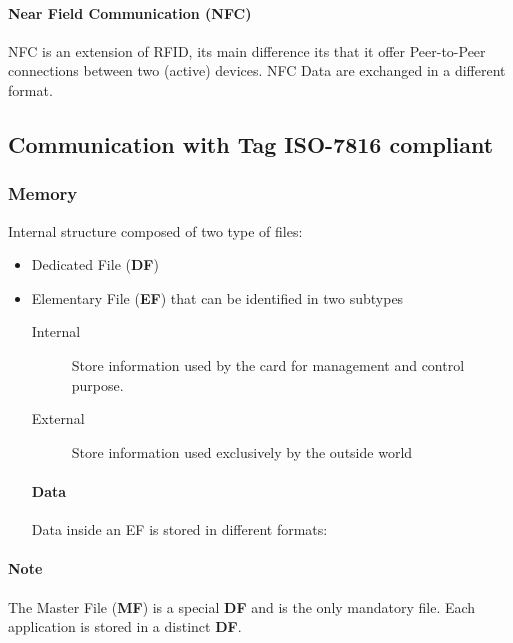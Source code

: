\paragraph{Near Field Communication (NFC)}
NFC is an extension of RFID, its main difference its that it offer
Peer-to-Peer connections between two (active) devices. NFC Data are exchanged
in a different format.


\subsection{Communication with Tag \textsc{ISO-7816} compliant}

\subsubsection{Memory}
    Internal structure composed of two type of files:
\begin{itemize}
    \item Dedicated File (\textbf{DF})
    \item Elementary File (\textbf{EF}) that can be identified in two subtypes
    \begin{description}
        \item[Internal] Store information used by the card for management and
        control purpose.
        \item[External] Store information used exclusively by the outside world
    \end{description}
    
    \paragraph{Data}
    Data inside an EF is stored in different formats:
\end{itemize}

\paragraph{Note} The Master File (\textbf{MF}) is a special \textbf{DF}
and is the only mandatory file. Each application is stored in a distinct
\textbf{DF}.

